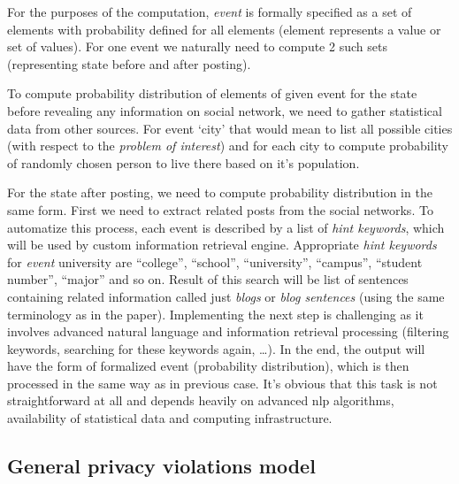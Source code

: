 \documentclass[a4paper]{article}
\begin{document}
For the purposes of the computation, \emph{event} is formally specified
as a set of elements with probability defined for all elements (element
represents a value or set of values). For one event we naturally need to
compute 2 such sets (representing state before and after posting).

To compute probability distribution of elements of given event for the
state before revealing any information on social network, we need to
gather statistical data from other sources. For event `city' that would
mean to list all possible cities (with respect to the \emph{problem of
interest}) and for each city to compute probability of randomly chosen
person to live there based on it's population.

For the state after posting, we need to compute probability
distribution in the same form. First we need to extract related posts
from the social networks. To automatize this process, each event is
described by a list of \emph{hint keywords}, which will be used by
custom information retrieval engine. Appropriate \emph{hint keywords}
for \emph{event} university are ``college'', ``school'', ``university'',
``campus'', ``student number'', ``major'' and so on. Result of this
search will be list of sentences containing related information called
just \emph{blogs} or \emph{blog sentences} (using the same terminology
as in the paper). Implementing the next step is challenging as it
involves advanced natural language and information retrieval processing
(filtering keywords, searching for these keywords again, \ldots{}). In
the end, the output will have the form of formalized event (probability
distribution), which is then processed in the same way as in previous
case. It's obvious that this task is not straightforward at all and
depends heavily on advanced nlp algorithms, availability of statistical
data and computing infrastructure.


\subsection{General privacy violations model}
\end{document}
